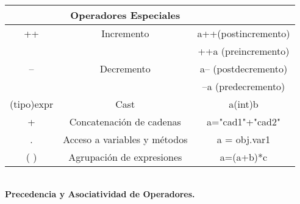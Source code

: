 \\
 \begin{table}[H]
	 \centering
	 \begin{tabular}{ c | c | c }
		 & \textbf{Operadores Especiales}& \\ \hline
		++ & Incremento	& a++(postincremento) \\ 
		   &            & ++a (preincremento) \\ \hline 
		-- & Decremento & a-- (postdecremento) \\ 
                   &            & --a (predecremento) \\ \hline
	(tipo)expr & Cast & a(int)b \\ \hline 
		 + & Concatenación de cadenas & a="cad1"+"cad2" \\ \hline 
		.  & Acceso a variables y métodos & a = obj.var1 \\ \hline 
		( )& Agrupación de expresiones & a=(a+b)*c \\ \hline

	\end{tabular} 
\end{table}
\\
\textbf{Precedencia y Asociatividad de Operadores.}
